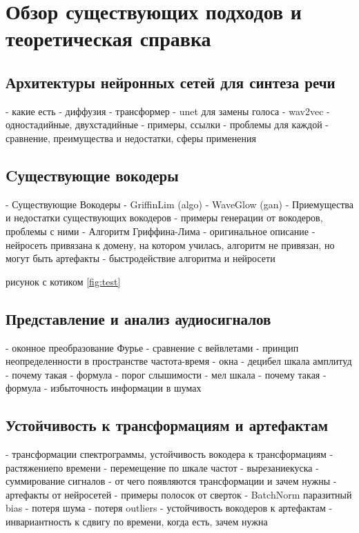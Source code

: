 \chapter{Обзор существующих подходов и теоретическая справка}
\label{cha:ch_1}


\section{Архитектуры нейронных сетей для синтеза речи}
 - какие есть
   - диффузия
   - трансформер
   - unet для замены голоса
   - wav2vec
   - одностадийные, двухстадийные
 - примеры, ссылки
 - проблемы для каждой
 - сравнение, преимущества и недостатки, сферы применения

\section{Cуществующие вокодеры}
 - Существующие Вокодеры
  - GriffinLim (algo) \cite{1164317}
  - WaveGlow (gan)
 - Приемущества и недостатки существующих вокодеров 
 - примеры генерации от вокодеров, проблемы с ними
 - Алгоритм Гриффина-Лима
  - оригинальное описание
 - нейросеть привязана к домену, на котором училась, алгоритм не привязан, но могут быть артефакты
 - быстродействие алгоритма и нейросети

рисунок с котиком \ref{fig:test}

\section{Представление и анализ аудиосигналов}
 - оконное преобразование Фурье
 - сравнение с вейвлетами
 - принцип неопределенности в пространстве частота-время
 - окна
 - децибел шкала амплитуд
   - почему такая
   - формула
   - порог слышимости
 - мел шкала
   - почему такая
   - формула
 - избыточность информации в шумах

 \section{Устойчивость к трансформациям и артефактам}
 - трансформации спектрограммы, устойчивость вокодера к трансформациям
   - растяжение по времени
   - перемещение по шкале частот
   - вырезание куска
   - суммирование сигналов
 - от чего появляются трансформации и зачем нужны
 - артефакты от нейросетей
   - примеры полосок от сверток
   - BatchNorm паразитный bias
   - потеря шума
   - потеря outliers
 - устойчивость вокодеров к артефактам
 - инвариантность к сдвигу по времени, когда есть, зачем нужна

